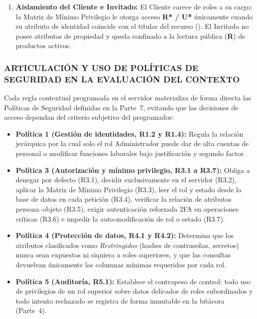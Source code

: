 \documentclass[12pt,letterpaper]{article}
\newcommand{\cod}[1]{\path{#1}}
\begin{document}
\begin{enumerate}
\begin{itemize}
  \end{itemize}
  \item \textbf{Aislamiento del Cliente e Invitado:} El Cliente carece de roles a su cargo; la Matriz de Mínimo Privilegio le otorga acceso \textbf{R* / U*} únicamente cuando su atributo de identidad coincide con el titular del recurso (\cod{id_cliente}). El Invitado no posee atributos de propiedad y queda confinado a la lectura pública (\textbf{R}) de productos activos.
\end{enumerate}

\subsubsection{ARTICULACIÓN Y USO DE POLÍTICAS DE SEGURIDAD EN LA EVALUACIÓN DEL CONTEXTO}

Cada regla contextual programada en el servidor materializa de forma directa las Políticas de Seguridad definidas en la Parte~7, evitando que las decisiones de acceso dependan del criterio subjetivo del programador:
\begin{itemize}
  \item \textbf{Política 1 (Gestión de identidades, R1.2 y R1.4):} Regula la relación jerárquica por la cual solo el rol Administrador puede dar de alta cuentas de personal o modificar funciones laborales bajo justificación y segundo factor.
  \item \textbf{Política 3 (Autorización y mínimo privilegio, R3.1 a R3.7):} Obliga a denegar por defecto (R3.1), decidir exclusivamente en el servidor (R3.2), aplicar la Matriz de Mínimo Privilegio (R3.3), leer el rol y estado desde la base de datos en cada petición (R3.4), verificar la relación de atributos persona--objeto (R3.5), exigir autenticación reforzada 2FA en operaciones críticas (R3.6) e impedir la auto-modificación de rol o estado (R3.7).
  \item \textbf{Política 4 (Protección de datos, R4.1 y R4.2):} Determina que los atributos clasificados como \emph{Restringidos} (hashes de contraseñas, secretos) nunca sean expuestos ni siquiera a roles superiores, y que las consultas devuelvan únicamente las columnas mínimas requeridas por cada rol.
  \item \textbf{Política 5 (Auditoría, R5.1):} Establece el contrapeso de control: todo uso de privilegios de un rol superior sobre datos delicados de roles subordinados y todo intento rechazado se registra de forma inmutable en la bitácora (Parte~4).
\end{itemize}
\end{document}
